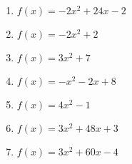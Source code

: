 \documentclass{article}%
\begin{document}
\begin{enumerate}[label=\alph*)]
\item%
\newline\vspace{0.5cm} $f(x)=-2x^2 + 24x - 2$%
\item%
\newline\vspace{0.5cm} $f(x)=-2x^2 + 2$%
\item%
\newline\vspace{0.5cm} $f(x)=3x^2 + 7$%
\item%
\newline\vspace{0.5cm} $f(x)=-x^2 - 2x + 8$%
\item%
\newline\vspace{0.5cm} $f(x)=4x^2 - 1$%
\item%
\newline\vspace{0.5cm} $f(x)=3x^2 + 48x + 3$%
\item%
\newline\vspace{0.5cm} $f(x)=3x^2 + 60x - 4$%
\end{enumerate}

%
\end{document}
